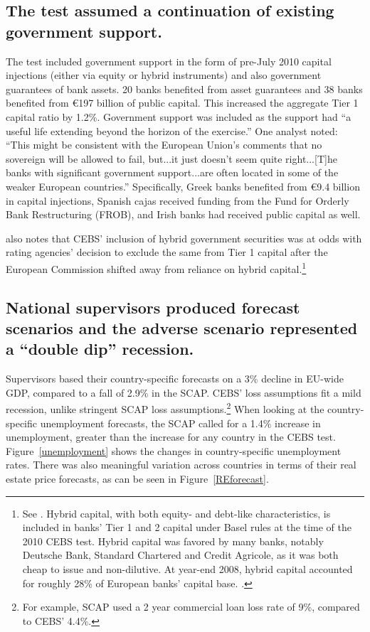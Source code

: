 \documentclass[12pt]{article}
\begin{document}
\subsection{The test assumed a continuation of existing government support.}

The test included government support in the form of pre-July 2010 capital injections (either via equity or hybrid instruments) and also government guarantees of bank assets. 20 banks benefited from asset guarantees and 38 banks benefited from \euro{197} billion of public capital. This increased the aggregate Tier 1 capital ratio by 1.2\%. Government support was included as the support had ``a useful life extending beyond the horizon of the exercise.'' One analyst noted: ``This might be consistent with the European Union's comments that no sovereign will be allowed to fail, but...it just doesn't seem quite right...[T]he banks with significant government support...are often located in some of the weaker European countries.'' \citep{Alloway} Specifically, Greek banks benefited from \euro{9.4} billion in capital injections, Spanish cajas received funding from the Fund for Orderly Bank Restructuring (FROB), and Irish banks had received public capital as well.

\citet{Alloway} also notes that CEBS' inclusion of hybrid government securities was at odds with rating agencies' decision to exclude the same from Tier 1 capital after the European Commission shifted away from reliance on hybrid capital.\footnote{See \citet{Fitch}. Hybrid capital, with both equity- and debt-like characteristics, is included in banks' Tier 1 and 2 capital under Basel rules at the time of the 2010 CEBS test. Hybrid capital was favored by many banks, notably Deutsche Bank, Standard Chartered and Credit Agricole, as it was both cheap to issue and non-dilutive. At year-end 2008, hybrid capital accounted for roughly 28\% of European banks' capital base. \citep{Alloway2}.}

\subsection{National supervisors produced forecast scenarios and the adverse scenario represented a ``double dip'' recession.}

Supervisors based their country-specific forecasts on a 3\% decline in EU-wide GDP, compared to a fall of 2.9\% in the SCAP. CEBS' loss assumptions fit a mild recession, unlike stringent SCAP loss assumptions.\footnote{For example, SCAP used a 2 year commercial loan loss rate of 9\%, compared to CEBS' 4.4\%.} When looking at the country-specific unemployment forecasts, the SCAP called for a 1.4\% increase in unemployment, greater than the increase for any country in the CEBS test. Figure~\ref{unemployment} shows the changes in country-specific unemployment rates. There was also meaningful variation across countries in terms of their real estate price forecasts, as can be seen in Figure~\ref{REforecast}.
\end{document}
